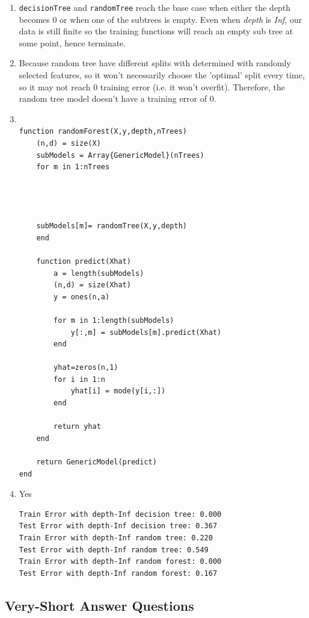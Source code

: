 \documentclass{article}
\begin{document}
\begin{enumerate}
\item \texttt{decisionTree} and \texttt{randomTree} reach the base case when either the depth becomes 0 or when one of the subtrees is empty. Even when \emph{depth} is \emph{Inf}, our data is still finite so the training functions will reach an empty sub tree at some point, hence terminate.
\item  Because random tree have different splits with determined with randomly selected features, so it won't necessarily choose the 'optimal' split every time, so it may not reach 0 training error (i.e. it won't overfit). Therefore, the random tree model doesn't have a training error of 0.

  

\item \begin{verbatim}

function randomForest(X,y,depth,nTrees)
    (n,d) = size(X)
    subModels = Array{GenericModel}(nTrees)
    for m in 1:nTrees
        
    
    
    
    subModels[m]= randomTree(X,y,depth)
    end
 
	function predict(Xhat)
        a = length(subModels)
        (n,d) = size(Xhat)
        y = ones(n,a)

        for m in 1:length(subModels)
            y[:,m] = subModels[m].predict(Xhat)
        end
        
        yhat=zeros(n,1)
        for i in 1:n
            yhat[i] = mode(y[i,:])
        end

        return yhat
    end
    
    return GenericModel(predict)
end
\end{verbatim}

\item
Yes
 \begin{verbatim}
Train Error with depth-Inf decision tree: 0.000
Test Error with depth-Inf decision tree: 0.367
Train Error with depth-Inf random tree: 0.220
Test Error with depth-Inf random tree: 0.549
Train Error with depth-Inf random forest: 0.000
Test Error with depth-Inf random forest: 0.167
\end{verbatim}


\end{enumerate}

\subsection{Very-Short Answer Questions}
\end{document}
